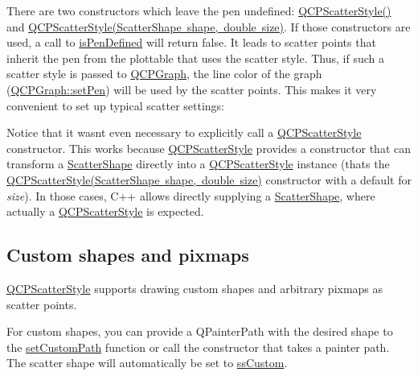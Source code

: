 There are two constructors which leave the pen undefined\+: \mbox{\hyperlink{class_q_c_p_scatter_style_a8836018d9ad83ccd8870de8315c1be73}{Q\+C\+P\+Scatter\+Style()}} and \mbox{\hyperlink{class_q_c_p_scatter_style_a003d92f74f4561eda111862eadd62f28}{Q\+C\+P\+Scatter\+Style(\+Scatter\+Shape shape, double size)}}. If those constructors are used, a call to \mbox{\hyperlink{class_q_c_p_scatter_style_a47077eb6450fe9a788f833e4ec1b1d5a}{is\+Pen\+Defined}} will return false. It leads to scatter points that inherit the pen from the plottable that uses the scatter style. Thus, if such a scatter style is passed to \mbox{\hyperlink{class_q_c_p_graph}{Q\+C\+P\+Graph}}, the line color of the graph (\mbox{\hyperlink{class_q_c_p_abstract_plottable_ab74b09ae4c0e7e13142fe4b5bf46cac7}{Q\+C\+P\+Graph\+::set\+Pen}}) will be used by the scatter points. This makes it very convenient to set up typical scatter settings\+:


\begin{DoxyCodeInclude}
\end{DoxyCodeInclude}
 Notice that it wasn\textquotesingle{}t even necessary to explicitly call a \mbox{\hyperlink{class_q_c_p_scatter_style}{Q\+C\+P\+Scatter\+Style}} constructor. This works because \mbox{\hyperlink{class_q_c_p_scatter_style}{Q\+C\+P\+Scatter\+Style}} provides a constructor that can transform a \mbox{\hyperlink{class_q_c_p_scatter_style_adb31525af6b680e6f1b7472e43859349}{Scatter\+Shape}} directly into a \mbox{\hyperlink{class_q_c_p_scatter_style}{Q\+C\+P\+Scatter\+Style}} instance (that\textquotesingle{}s the \mbox{\hyperlink{class_q_c_p_scatter_style_a003d92f74f4561eda111862eadd62f28}{Q\+C\+P\+Scatter\+Style(\+Scatter\+Shape shape, double size)}} constructor with a default for {\itshape size}). In those cases, C++ allows directly supplying a \mbox{\hyperlink{class_q_c_p_scatter_style_adb31525af6b680e6f1b7472e43859349}{Scatter\+Shape}}, where actually a \mbox{\hyperlink{class_q_c_p_scatter_style}{Q\+C\+P\+Scatter\+Style}} is expected.\hypertarget{class_q_c_p_scatter_style_QCPScatterStyle-custompath-and-pixmap}{}\subsection{Custom shapes and pixmaps}\label{class_q_c_p_scatter_style_QCPScatterStyle-custompath-and-pixmap}
\mbox{\hyperlink{class_q_c_p_scatter_style}{Q\+C\+P\+Scatter\+Style}} supports drawing custom shapes and arbitrary pixmaps as scatter points.

For custom shapes, you can provide a Q\+Painter\+Path with the desired shape to the \mbox{\hyperlink{class_q_c_p_scatter_style_a96a3e949f90b2afe5677ca9412a12a1e}{set\+Custom\+Path}} function or call the constructor that takes a painter path. The scatter shape will automatically be set to \mbox{\hyperlink{class_q_c_p_scatter_style_adb31525af6b680e6f1b7472e43859349a15d9bcfd9de94edda949006529f9219d}{ss\+Custom}}.


